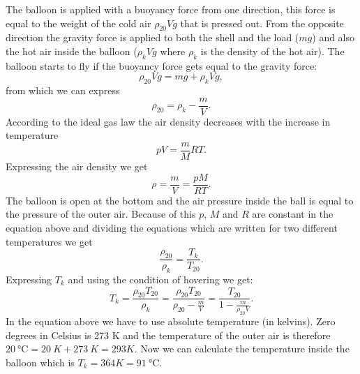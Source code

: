 \documentclass[11pt]{article}
\begin{document}
\solueng
The balloon is applied with a buoyancy force from one direction, this force is equal to the weight of the cold air $\rho_{20} V g$ that is pressed out. From the opposite direction the gravity force is applied to both the shell and the load ($mg$) and also the hot air inside the balloon ($\rho_k V g$ where $\rho_k$ is the density of the hot air). The balloon starts to fly if the buoyancy force gets equal to the gravity force:
\[ \rho_{20} V g=mg+\rho_k V g,\] 
from which we can express
\[ \rho_{20}=\rho_k-\frac{m}{V}.\] 
According to the ideal gas law the air density decreases with the increase in temperature 
\[ pV=\frac{m}{M}RT. \] 
Expressing the air density we get
\[ \rho=\frac{m}{V}=\frac{pM}{RT}.\] 
The balloon is open at the bottom and the air pressure inside the ball is equal to the pressure of the outer air. Because of this $p$, $M$ and $R$ are constant in the equation above and dividing the equations which are written for two different temperatures we get
\[ \frac{\rho_{20}}{\rho_k}=\frac{T_k}{T_{20}}.\] 
Expressing $T_k$ and using the condition of hovering we get:
\[ T_k=\frac{\rho_{20} T_{20}}{\rho_k}=\frac{\rho_{20} 
T_{20}}{\rho_{20}-\frac{m}{V}}=\frac{T_{20}}{1-\frac{m}{\rho_{20}V}}.\] 
In the equation above we have to use absolute temperature (in kelvins). Zero degrees in Celsius is 273 K and the temperature of the outer air is therefore $\SI{20}{\degreeCelsius}=\SI{20}{K} + \SI{273}{K}=\SI{293}K$. Now we can calculate the temperature inside the balloon which is $T_k=\SI{364}K=\SI{91}\degreeCelsius$.
\probend
\bigskip

\end{document}
